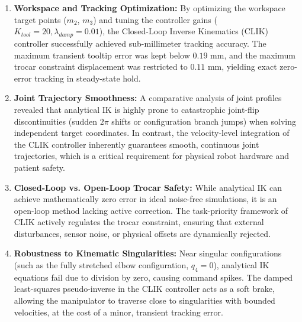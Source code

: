 \documentclass[11pt,a4paper]{article}
\begin{document}
\begin{enumerate}
    \item \textbf{Workspace and Tracking Optimization:} By optimizing the workspace target points ($m_2$, $m_3$) and tuning the controller gains ($K_{tool} = 20, \lambda_{damp} = 0.01$), the Closed-Loop Inverse Kinematics (CLIK) controller successfully achieved sub-millimeter tracking accuracy. The maximum transient tooltip error was kept below $0.19\text{ mm}$, and the maximum trocar constraint displacement was restricted to $0.11\text{ mm}$, yielding exact zero-error tracking in steady-state hold.
    \item \textbf{Joint Trajectory Smoothness:} A comparative analysis of joint profiles revealed that analytical IK is highly prone to catastrophic joint-flip discontinuities (sudden $2\pi$ shifts or configuration branch jumps) when solving independent target coordinates. In contrast, the velocity-level integration of the CLIK controller inherently guarantees smooth, continuous joint trajectories, which is a critical requirement for physical robot hardware and patient safety.
    \item \textbf{Closed-Loop vs. Open-Loop Trocar Safety:} While analytical IK can achieve mathematically zero error in ideal noise-free simulations, it is an open-loop method lacking active correction. The task-priority framework of CLIK actively regulates the trocar constraint, ensuring that external disturbances, sensor noise, or physical offsets are dynamically rejected.
    \item \textbf{Robustness to Kinematic Singularities:} Near singular configurations (such as the fully stretched elbow configuration, $q_4 = 0$), analytical IK equations fail due to division by zero, causing command spikes. The damped least-squares pseudo-inverse in the CLIK controller acts as a soft brake, allowing the manipulator to traverse close to singularities with bounded velocities, at the cost of a minor, transient tracking error.
\end{enumerate}
\end{document}
